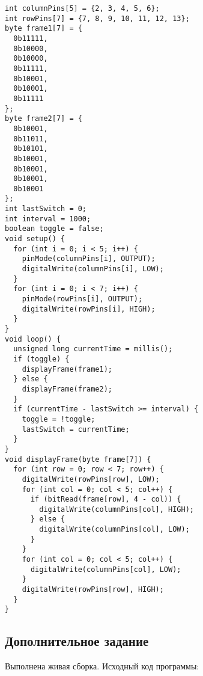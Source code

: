 \documentclass[a4paper,14pt]{extarticle}
\begin{document}
  \begingroup
    \fontsize{14pt}{10pt}\selectfont
    \linespread{1}
    \begin{verbatim}
int columnPins[5] = {2, 3, 4, 5, 6};
int rowPins[7] = {7, 8, 9, 10, 11, 12, 13};
byte frame1[7] = {
  0b11111,
  0b10000,
  0b10000,
  0b11111,
  0b10001,
  0b10001,
  0b11111
};
byte frame2[7] = {
  0b10001,
  0b11011,
  0b10101,
  0b10001,
  0b10001,
  0b10001,
  0b10001
};
int lastSwitch = 0;
int interval = 1000;
boolean toggle = false;
void setup() {
  for (int i = 0; i < 5; i++) {
    pinMode(columnPins[i], OUTPUT);
    digitalWrite(columnPins[i], LOW);
  }
  for (int i = 0; i < 7; i++) {
    pinMode(rowPins[i], OUTPUT);
    digitalWrite(rowPins[i], HIGH);
  }
}
void loop() {
  unsigned long currentTime = millis();
  if (toggle) {
    displayFrame(frame1);
  } else {
    displayFrame(frame2);
  }
  if (currentTime - lastSwitch >= interval) {
    toggle = !toggle;
    lastSwitch = currentTime;
  }
}
void displayFrame(byte frame[7]) {
  for (int row = 0; row < 7; row++) {
    digitalWrite(rowPins[row], LOW);
    for (int col = 0; col < 5; col++) {
      if (bitRead(frame[row], 4 - col)) {
        digitalWrite(columnPins[col], HIGH);
      } else {
        digitalWrite(columnPins[col], LOW);
      }
    }
    for (int col = 0; col < 5; col++) {
      digitalWrite(columnPins[col], LOW);
    }
    digitalWrite(rowPins[row], HIGH);
  }
}
    \end{verbatim}
  \endgroup

  \subsection*{\hspace{12.5mm}Дополнительное задание}
  Выполнена живая сборка. Исходный код программы:
\end{document}
